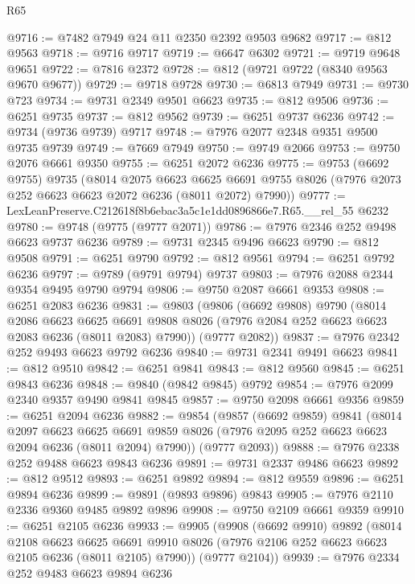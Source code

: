 \begin{lexlean}{R65}
\begin{coremodule}
{@9716 := @7482 @7949 @24 @11 @2350 @2392 @9503 @9682
@9717 := @812 @9563
@9718 := @9716 @9717
@9719 := @6647 @6302
@9721 := @9719 @9648 @9651
@9722 := @7816 @2372
@9728 := @812 (@9721 @9722 (@8340 @9563 @9670 @9677))
@9729 := @9718 @9728
@9730 := @6813 @7949
@9731 := @9730 @723
@9734 := @9731 @2349 @9501 @6623
@9735 := @812 @9506
@9736 := @6251 @9735
@9737 := @812 @9562
@9739 := @6251 @9737 @6236
@9742 := @9734 (@9736 @9739) @9717
@9748 := @7976 @2077 @2348 @9351 @9500 @9735 @9739
@9749 := @7669 @7949
@9750 := @9749 @2066
@9753 := @9750 @2076 @6661 @9350
@9755 := @6251 @2072 @6236
@9775 := @9753
    (@6692 @9755)
    @9735
    (@8014
      @2075
      @6623
      @6625
      @6691
      @9755
      @8026
      (@7976 @2073 @252 @6623 @6623 @2072 @6236 (@8011 @2072) @7990))
@9777 := LexLeanPreserve.C212618f8b6ebac3a5c1e1dd0896866e7.R65.__rel_55 @6232
@9780 := @9748 (@9775 (@9777 @2071))
@9786 := @7976 @2346 @252 @9498 @6623 @9737 @6236
@9789 := @9731 @2345 @9496 @6623
@9790 := @812 @9508
@9791 := @6251 @9790
@9792 := @812 @9561
@9794 := @6251 @9792 @6236
@9797 := @9789 (@9791 @9794) @9737
@9803 := @7976 @2088 @2344 @9354 @9495 @9790 @9794
@9806 := @9750 @2087 @6661 @9353
@9808 := @6251 @2083 @6236
@9831 := @9803
    (@9806
      (@6692 @9808)
      @9790
      (@8014
        @2086
        @6623
        @6625
        @6691
        @9808
        @8026
        (@7976 @2084 @252 @6623 @6623 @2083 @6236 (@8011 @2083) @7990))
      (@9777 @2082))
@9837 := @7976 @2342 @252 @9493 @6623 @9792 @6236
@9840 := @9731 @2341 @9491 @6623
@9841 := @812 @9510
@9842 := @6251 @9841
@9843 := @812 @9560
@9845 := @6251 @9843 @6236
@9848 := @9840 (@9842 @9845) @9792
@9854 := @7976 @2099 @2340 @9357 @9490 @9841 @9845
@9857 := @9750 @2098 @6661 @9356
@9859 := @6251 @2094 @6236
@9882 := @9854
    (@9857
      (@6692 @9859)
      @9841
      (@8014
        @2097
        @6623
        @6625
        @6691
        @9859
        @8026
        (@7976 @2095 @252 @6623 @6623 @2094 @6236 (@8011 @2094) @7990))
      (@9777 @2093))
@9888 := @7976 @2338 @252 @9488 @6623 @9843 @6236
@9891 := @9731 @2337 @9486 @6623
@9892 := @812 @9512
@9893 := @6251 @9892
@9894 := @812 @9559
@9896 := @6251 @9894 @6236
@9899 := @9891 (@9893 @9896) @9843
@9905 := @7976 @2110 @2336 @9360 @9485 @9892 @9896
@9908 := @9750 @2109 @6661 @9359
@9910 := @6251 @2105 @6236
@9933 := @9905
    (@9908
      (@6692 @9910)
      @9892
      (@8014
        @2108
        @6623
        @6625
        @6691
        @9910
        @8026
        (@7976 @2106 @252 @6623 @6623 @2105 @6236 (@8011 @2105) @7990))
      (@9777 @2104))
@9939 := @7976 @2334 @252 @9483 @6623 @9894 @6236
}
\end{coremodule}
\end{lexlean}
